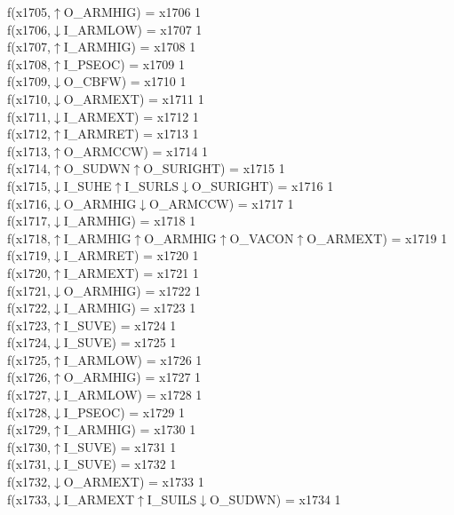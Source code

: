 f(x1705,$\uparrow$O\_ARMHIG) = x1706 {1} \\
f(x1706,$\downarrow$I\_ARMLOW) = x1707 {1} \\
f(x1707,$\uparrow$I\_ARMHIG) = x1708 {1} \\
f(x1708,$\uparrow$I\_PSEOC) = x1709 {1} \\
f(x1709,$\downarrow$O\_CBFW) = x1710 {1} \\
f(x1710,$\downarrow$O\_ARMEXT) = x1711 {1} \\
f(x1711,$\downarrow$I\_ARMEXT) = x1712 {1} \\
f(x1712,$\uparrow$I\_ARMRET) = x1713 {1} \\
f(x1713,$\uparrow$O\_ARMCCW) = x1714 {1} \\
f(x1714,$\uparrow$O\_SUDWN$\uparrow$O\_SURIGHT) = x1715 {1} \\
f(x1715,$\downarrow$I\_SUHE$\uparrow$I\_SURLS$\downarrow$O\_SURIGHT) = x1716 {1} \\
f(x1716,$\downarrow$O\_ARMHIG$\downarrow$O\_ARMCCW) = x1717 {1} \\
f(x1717,$\downarrow$I\_ARMHIG) = x1718 {1} \\
f(x1718,$\uparrow$I\_ARMHIG$\uparrow$O\_ARMHIG$\uparrow$O\_VACON$\uparrow$O\_ARMEXT) = x1719 {1} \\
f(x1719,$\downarrow$I\_ARMRET) = x1720 {1} \\
f(x1720,$\uparrow$I\_ARMEXT) = x1721 {1} \\
f(x1721,$\downarrow$O\_ARMHIG) = x1722 {1} \\
f(x1722,$\downarrow$I\_ARMHIG) = x1723 {1} \\
f(x1723,$\uparrow$I\_SUVE) = x1724 {1} \\
f(x1724,$\downarrow$I\_SUVE) = x1725 {1} \\
f(x1725,$\uparrow$I\_ARMLOW) = x1726 {1} \\
f(x1726,$\uparrow$O\_ARMHIG) = x1727 {1} \\
f(x1727,$\downarrow$I\_ARMLOW) = x1728 {1} \\
f(x1728,$\downarrow$I\_PSEOC) = x1729 {1} \\
f(x1729,$\uparrow$I\_ARMHIG) = x1730 {1} \\
f(x1730,$\uparrow$I\_SUVE) = x1731 {1} \\
f(x1731,$\downarrow$I\_SUVE) = x1732 {1} \\
f(x1732,$\downarrow$O\_ARMEXT) = x1733 {1} \\
f(x1733,$\downarrow$I\_ARMEXT$\uparrow$I\_SUILS$\downarrow$O\_SUDWN) = x1734 {1} \\
